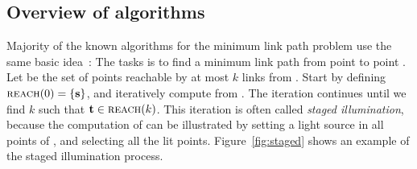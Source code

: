 \documentclass[english,gradu]{tktltiki2018}
\begin{document}
\subsection{Overview of algorithms}\label{sec:overview}

Majority of the known algorithms for the minimum link path problem use the same basic idea~\cite[Sections 26.4, 27.3]{handbook}:
The tasks is to find a minimum link path from point \spt to point \ept.
Let  be the set of points reachable by at most $k$ links from \spt.
Start by defining $\textsc{reach}(0)=\left\{\textbf{s}\right\}$, and iteratively compute  from .
The iteration continues until we find $k$ such that $\textbf{t}\in\textsc{reach}(k)$.
This iteration is often called \emph{staged illumination}, because the computation of  can be illustrated by setting a light source in all points of , and selecting all the lit points.
Figure~\ref{fig:staged} shows an example of the staged illumination process.
\end{document}

